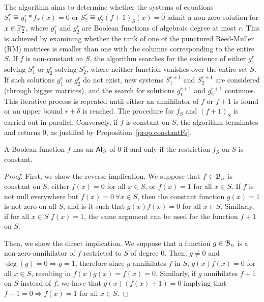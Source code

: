 \documentclass[11pt]{llncs}
\begin{document}
The algorithm aims to determine whether the systems of equations $S_1^r \hat{=}g_1^r*f_S (x)= \hat{0}$ or $S_2^r\hat{=}g_2^r (f+ 1)_S (x) = \hat{0}$ admit a non-zero solution for $x \in \mathbb{F}_2^n$, where $g_1^r$ and $ g_2^r$ are Boolean functions of algebraic degree at most $ r$. 
This is achieved by examining whether the rank of one of the punctured Reed-Muller (RM) matrices is smaller than one with the columns corresponding to the entire $S$.
If $f$ is non-constant on $S$, the algorithm searches for the existence of either $g_1^r$ solving $S_1^r$ or $g_2^r$ solving $S_2^r$, where neither function vanishes over the entire set \( S \). 
If such solutions \( g_1^r \) or \( g_2^r \) do not exist, new systems \( S_1^{r+1} \) and \( S_2^{r+1} \) are considered (through bigger matrices), and the search for solutions \( g_1^{r+1} \) and \( g_2^{r+1} \) continues. This iterative process is repeated until either an annihilator of \( f \) or \( f + 1 \) is found or an upper bound \( r + \delta \) is reached. The procedure for \( f_S \) and \( (f + 1)_S \) is carried out in parallel.
Conversely, if \( f \) is constant on \( S \), the algorithm terminates and returns \( 0 \), as justified by Proposition~\ref{prop:constantFs}. 


\begin{proposition}\label{prop:constantFs}
	A Boolean function $f$ has an $\mathsf{AI}_S$ of $0$ if and only if the restriction $f_S$ on $S$ is constant.
\end{proposition}

\begin{proof}
	First, we show the reverse implication.
	We suppose that $f\in \mathcal{B}_n$ is constant on $S$, either $f(x) = 0$ for all $x\in S$, or $f(x) = 1$ for all $x\in S$.
	If $f$ is not null everywhere but $f(x) = 0\ \forall x \in  S$, then the constant function $g(x) = 1$ is not zero on all $S$, and is it such that $g(x)f(x) = 0$ for all $x\in S$. 
	Similarly, if for all $x\in S$ $f(x) = 1$, the same argument can be used for the function $f+ 1$ on $S$.
	
	Then, we show the direct implication.
	We suppose that a function $g\in \mathcal{B}_n$ is a non-zero-annihilator of $f$ restricted to $S$ of degree $0$. Then,
	$g \neq 0$ and $\deg(g) = 0 \Rightarrow g = 1$, therefore since $g$ annihilates $f$ in $S$,  $g(x) f(x) = 0$ for all $x \in S$, resulting in $f(x)g(x) = f(x) = 0$.
	Similarly, if $g$ annihilates $f+ 1$ on $S$ instead of $f$, we have that $g(x)(f(x) + 1) = 0$ implying that $f+ 1 = 0 \Rightarrow f(x) = 1$ for all $x\in S$. 
\end{proof}
\end{document}
